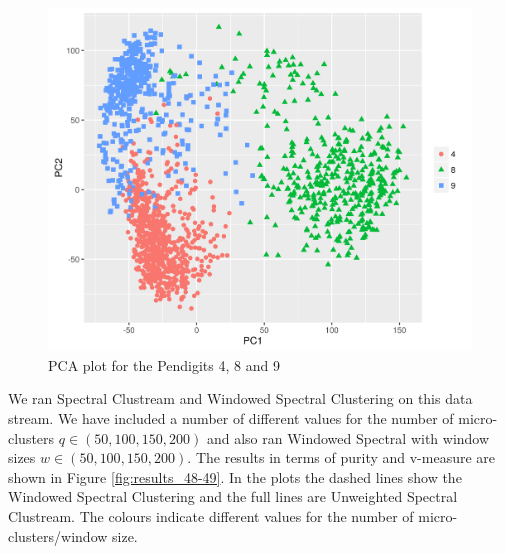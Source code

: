 \begin{figure}[!h]
  \centering
 \includegraphics[width=.6\linewidth]{evolving_pen/evolving_pen_48_49_truth.png}  
\caption{PCA plot for the Pendigits 4, 8 and 9}
\label{fig:48_49_pca}
\end{figure}

We ran Spectral Clustream and Windowed Spectral Clustering on this  data stream. We have included a number of different values for the number of micro-clusters  $q \in (50, 100, 150, 200)$ and also ran Windowed Spectral with window sizes $w \in( 50,100,150, 200)$. The results in terms of purity and v-measure are shown in Figure \ref{fig:results_48-49}.  In the plots the dashed lines show the Windowed Spectral Clustering and the full lines are Unweighted Spectral Clustream. The colours indicate different values for the number of micro-clusters/window size. 


